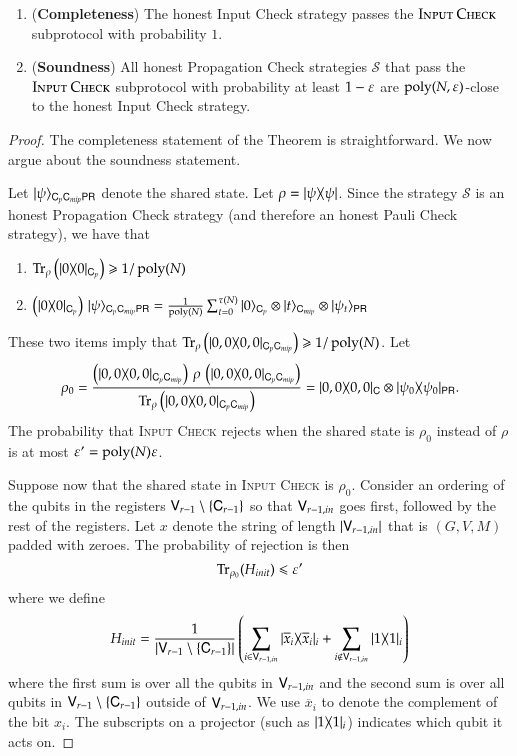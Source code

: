 \begin{theorem}	
\label{thm:input_check}
\begin{enumerate}
	\item (\textbf{Completeness}) The honest Input Check strategy passes the $\textsc{Input Check}$ subprotocol with probability $1$. 
	\item (\textbf{Soundness}) All honest Propagation Check strategies $\mathcal{S}$ that pass the $\textsc{Input Check}$ subprotocol with probability at least $1 - \varepsilon$ are $\operatorname{poly}(N,\varepsilon)$-close to the honest Input Check strategy.
\end{enumerate}
\end{theorem}
\begin{proof}
The completeness statement of the Theorem is straightforward. We now argue about the soundness statement.

Let $|\psi\rangle_{{\mathsf{C}}_p {\mathsf{C}}_{mip} {\mathsf{P}} {\mathsf{R}}}$ denote the shared state. Let $\rho = |\psi\rangle\! \langle \psi|$. Since the strategy $\mathcal{S}$ is an honest Propagation Check strategy (and therefore an honest Pauli Check strategy), we have that
\begin{enumerate}
	\item $\operatorname{Tr}_\rho \left ( |0\rangle\! \langle 0|_{{\mathsf{C}}_p} \right) \geqslant 1/\operatorname{poly}(N)$
	\item $	\left( |0\rangle\! \langle 0|_{{\mathsf{C}}_p} \right) \, |\psi\rangle_{{\mathsf{C}}_p {\mathsf{C}}_{mip} {\mathsf{P}} {\mathsf{R}}} = \frac{1}{\operatorname{poly}(N)} \sum_{t = 0}^{\tau(N)} |0\rangle_{{\mathsf{C}}_p} \otimes |t\rangle_{{\mathsf{C}}_{mip}} \otimes |\psi_t\rangle_{{\mathsf{P}} {\mathsf{R}}}$
\end{enumerate}
These two items imply that $\operatorname{Tr}_\rho \left ( |0,0\rangle\! \langle 0,0|_{{\mathsf{C}}_p {\mathsf{C}}_{mip}} \right) \geqslant 1/\operatorname{poly}(N)$. Let 
\[
	\rho_0 = \frac{\left ( |0,0\rangle\! \langle 0,0|_{{\mathsf{C}}_p {\mathsf{C}}_{mip}} \right) \, \rho \, \left ( |0,0\rangle\! \langle 0,0|_{{\mathsf{C}}_p {\mathsf{C}}_{mip}} \right)}{\operatorname{Tr}_\rho \left ( |0,0\rangle\! \langle 0,0|_{{\mathsf{C}}_p {\mathsf{C}}_{mip}} \right)} = |0,0\rangle\! \langle 0,0|_{{\mathsf{C}}} \otimes |\psi_0\rangle\! \langle \psi_0|_{{\mathsf{P}} {\mathsf{R}}}.
\]
The probability that \textsc{Input Check} rejects when the shared state is $\rho_0$ instead of $\rho$ is at most $\varepsilon' = \operatorname{poly}(N) \varepsilon$. 

Suppose now that the shared state in \textsc{Input Check} is $\rho_0$. Consider an ordering of the qubits in the registers ${\mathsf{V}}_{r-1} \setminus \{ {\mathsf{C}}_{r-1} \}$ so that ${\mathsf{V}}_{r-1,in}$ goes first, followed by the rest of the registers. Let $x$ denote the string of length $|{\mathsf{V}}_{r-1,in}|$ that is $(G,V,M)$ padded with zeroes. The probability of rejection is then
	\begin{equation}
		\Tr_{\rho_0} ( H_{init} ) \leq \eps'
		\label{eq:init}
	\end{equation}
	where we define 
	\[
		H_{init} = \frac{1}{\left | {\mathsf{V}}_{r-1} \setminus \{ {\mathsf{C}}_{r-1} \} \right|} \left ( \sum_{i \in {\mathsf{V}}_{r-1,in}} |\overline{x}_i\rangle\! \langle \overline{x}_i|_i +  \sum_{i \notin {\mathsf{V}}_{r-1,in}} |1\rangle\! \langle 1|_i \right)
	\] 
	where the first sum is over all the qubits in ${\mathsf{V}}_{r-1,in}$ and the second sum is over all qubits in ${\mathsf{V}}_{r-1} \setminus \{ {\mathsf{C}}_{r-1} \}$ outside of ${\mathsf{V}}_{r-1,in}$. We use $\overline{x}_i$ to denote the complement of the bit $x_i$. The subscripts on a projector (such as $|1\rangle\! \langle 1|_i$) indicates which qubit it acts on.
	

\end{proof}
